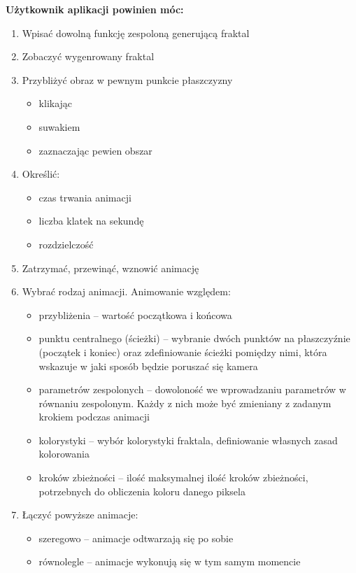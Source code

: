 \documentclass[a4paper]{article}
\begin{document}
\textbf{Użytkownik aplikacji powinien móc:}
\begin{enumerate}
\item Wpisać dowolną funkcję zespoloną generującą fraktal
\item Zobaczyć wygenrowany fraktal
\item Przybliżyć obraz w pewnym punkcie płaszczyzny
\begin{itemize}
\item klikając
\item suwakiem
\item zaznaczając pewien obszar
\end{itemize}
\item Określić:
\begin{itemize}
\item czas trwania animacji
\item liczba klatek na sekundę
\item rozdzielczość
\end{itemize}

\item Zatrzymać, przewinąć, wznowić animację
\item Wybrać rodzaj animacji. Animowanie względem:
\begin{itemize}
\item przybliżenia -- wartość początkowa i końcowa
\item punktu centralnego (ścieżki) -- wybranie dwóch punktów na płaszczyźnie (początek i koniec) oraz zdefiniowanie ścieżki pomiędzy nimi, która wskazuje w jaki sposób będzie poruszać się kamera
\item parametrów zespolonych -- dowoloność we wprowadzaniu parametrów w równaniu zespolonym. Każdy z nich może być zmieniany z zadanym krokiem podczas animacji
\item kolorystyki -- wybór kolorystyki fraktala, definiowanie własnych zasad kolorowania
\item kroków zbieżności -- ilość maksymalnej ilość kroków zbieżności, potrzebnych do obliczenia koloru danego piksela
\end{itemize}

\item Łączyć powyższe animacje:
\begin{itemize}
\item szeregowo -- animacje odtwarzają się po sobie
\item równolegle -- animacje wykonują się w tym samym momencie
\end{itemize}


\end{enumerate}
\end{document}
